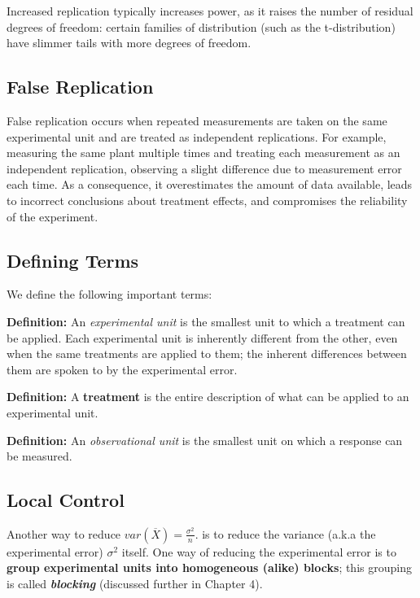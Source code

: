 \documentclass{tufte-book}
\begin{document}
Increased replication typically increases power, as it raises the number of residual degrees of freedom: certain 
families of distribution (such as the t-distribution) have slimmer tails with more degrees of freedom. \newline

\subsection{False Replication}

False replication occurs when repeated measurements are taken on the same experimental unit and are treated as independent 
replications. For example, measuring the same plant multiple times and treating each measurement as an independent 
replication, observing a slight difference due to measurement error each time. As a consequence, it overestimates 
the amount of data available, leads to incorrect conclusions about treatment effects, and compromises the reliability of 
the experiment. 

\subsection{Defining Terms}

We define the following important terms:

\textbf{Definition: } An \textit{experimental unit} is the smallest unit to which a treatment can be applied. Each experimental unit is inherently different from the other, even when the same treatments are applied to them; the inherent differences between them are spoken to by the experimental error. 

\textbf{Definition:} A \textbf{treatment} is the entire description of what can be applied to an experimental unit.

\textbf{Definition: } An \textit{observational unit} is the smallest unit on which a response can be measured. 

\subsection{Local Control}

Another way to reduce $var (\overline{X}) = \frac{\sigma^{2}}{n}.$ is to reduce the variance (a.k.a the experimental error) 
$\sigma^{2}$ itself. One way of reducing the experimental error is to \textbf{group experimental units into homogeneous (alike) 
blocks}; this grouping is called \textit{\textbf{blocking}} (discussed further in Chapter 4). \newline
\end{document}
